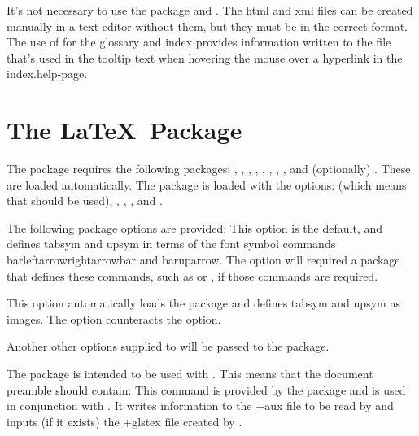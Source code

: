 \documentclass[toc=listof]{scrreport}
\begin{document}
\begin{information}
It's not necessary to use the  package and .
The \gls{html} and \gls{xml} files can be created manually in a text editor 
without them, but they must be in the correct format. The use of 
for the glossary and index provides information written to the 
file that's used in the tooltip text when hovering the mouse over a hyperlink
in the \gls{index.help-page}.
\end{information}

\chapter{The  \LaTeX\ Package}
\label{sec:texjavahelpsty}


The  package requires the following packages:
, , ,
, , , , ,
and (optionally) . These are loaded automatically.
The  package is loaded with the options:
 (which means that  should be used),
, , , 
and .

The following  package options are provided:
This option is the default, and defines \gls{tabsym} and \gls{upsym} in terms of
the font symbol commands \gls{barleftarrowrightarrowbar}
and \gls{baruparrow}. The  option will required a package that defines
these commands, such as  or , if those commands are required.

This option automatically loads the  package and 
defines \gls{tabsym} and \gls{upsym} as images.
The  option counteracts the  option.

Another other options supplied to  will be passed to
the  package.

The  package is intended to be used with . This means
that the document preamble should contain:
This command is provided by the  package and is used 
in conjunction with . It writes information
to the \ext+{aux} file to be read by  and inputs
(if it exists) the \ext+{glstex} file created by .
\end{document}

